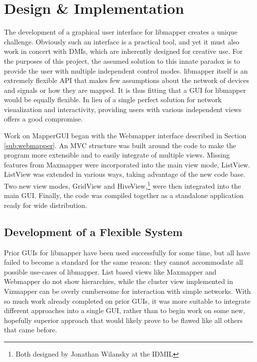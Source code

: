 \chapter{Design \& Implementation}

	The development of a graphical user interface for libmapper creates a unique challenge. Obviously such an interface is a practical tool, and yet it must also work in concert with DMIs, which are inherently designed for creative use. For the purposes of this project, the assumed solution to this innate paradox is to provide the user with multiple independent control modes. libmapper itself is an extremely flexible API that makes few assumptions about the network of devices and signals or how they are mapped. It is thus fitting that a GUI for libmapper would be equally flexible. In lieu of a single perfect solution for network visualization and interactivity, providing users with various independent views offers a good compromise.

	Work on MapperGUI began with the Webmapper interface described in Section \ref{sub:webmapper}. An MVC structure was built around the code to make the program more extensible and to easily integrate of multiple views. Missing features from Maxmapper were incorporated into the main view mode, ListView. ListView was extended in various ways, taking advantage of the new code base. Two new view modes, GridView and HiveView,\footnote{Both designed by Jonathan Wilansky at the IDMIL} were then integrated into the main GUI. Finally, the code was compiled together as a standalone application ready for wide distribution.

\section{Development of a Flexible System} %
\label{sec:development_of_a_flexible_system}

Prior GUIs for libmapper have been used successfully for some time, but all have failed to become a standard for the same reason: they cannot accommodate all possible use-cases of libmapper. List based views like Maxmapper and Webmapper do not show hierarchies, while the cluster view implemented in Vizmapper can be overly cumbersome for interaction with simple networks. With so much work already completed on prior GUIs, it was more suitable to integrate different approaches into a single GUI, rather than to begin work on some new, hopefully superior approach that would likely prove to be flawed like all others that came before. 

